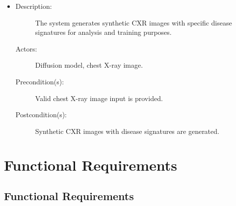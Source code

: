 \documentclass[12pt]{article}
\begin{document}
\begin{itemize}
    \item 
    \begin{description}
        \item[Description:] The system generates synthetic CXR images with specific disease signatures for analysis and training purposes.
        \item[Actors:] Diffusion model, chest X-ray image.
        \item[Precondition(s):] Valid chest X-ray image input is provided.
        \item[Postcondition(s):] Synthetic CXR images with disease signatures are generated.
    \end{description}
\end{itemize}

\section{Functional Requirements}
\subsection{Functional Requirements}
\end{document}
